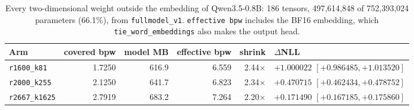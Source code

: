 \begin{table}[t]
\centering
\small
\begin{tabular}{lrrrrl}
\toprule
Arm & covered bpw & model MB & effective bpw & shrink & $\Delta$NLL \\
\midrule
\texttt{r1600\_k81} & 1.7250 & 616.9 & 6.559 & 2.44$\times$ & $+1.000022$ $[+0.986485, +1.013520]$ \\
\texttt{r2000\_k255} & 2.1250 & 641.7 & 6.823 & 2.34$\times$ & $+0.470715$ $[+0.462434, +0.478752]$ \\
\texttt{r2667\_k1625} & 2.7919 & 683.2 & 7.264 & 2.20$\times$ & $+0.171490$ $[+0.167185, +0.175860]$ \\
\bottomrule
\end{tabular}
\caption{Every two-dimensional weight outside the embedding of Qwen3.5-0.8B: 186 tensors, 497,614,848 of 752,393,024 parameters (66.1\%), from \texttt{fullmodel\_v1}. \texttt{effective bpw} includes the BF16 embedding, which \texttt{tie\_word\_embeddings} also makes the output head.}
\label{tab:fullmodel}
\end{table}
